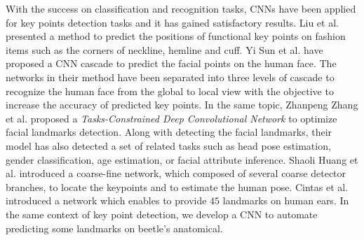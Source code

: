 \documentclass[review]{elsarticle}
\begin{document}
With the success on classification and recognition tasks, CNNs have been applied for key points detection tasks and it has gained satisfactory results. Liu et al. \cite{liu2016fashion} presented a method to predict the positions of functional key points on fashion items such as the corners of neckline, hemline and cuff. Yi Sun et al. \cite{sun2013deep} have proposed a CNN cascade to predict the facial points on the human face. The networks in their method have been separated into three levels of cascade to recognize the human face from the global to local view with the objective to increase the accuracy of predicted key points. In the same topic, Zhanpeng Zhang et al. \cite{zhang2014facial} proposed a \textit{Tasks-Constrained Deep Convolutional Network} to optimize facial landmarks detection. Along with detecting the facial landmarks, their model has also detected a set of related tasks such as head pose estimation, gender classification, age estimation, or facial attribute inference. Shaoli Huang et al. \cite{huang2017coarse} introduced a coarse-fine network, which composed of several coarse detector branches, to locate the keypoints and to estimate the human pose. Cintas et al. \cite{cintas2016automatic} introduced a network which enables to provide $45$ landmarks on human ears. In the same context of key point detection, we develop a CNN to automate predicting some landmarks on beetle's anatomical.

\end{document}
